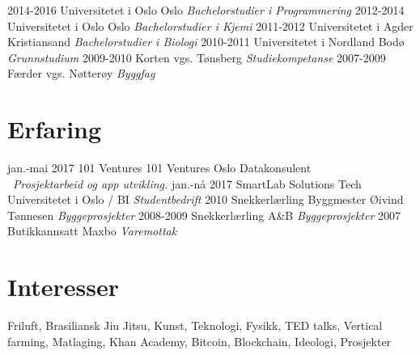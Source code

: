 \documentclass[]{friggeri-cv}
\begin{document}
\begin{entrylist}
  \entry
    {2014-2016}
    {Universitetet i Oslo}
    {Oslo}
    {\emph{Bachelorstudier i Programmering}}
  \entry
    {2012-2014}
    {Universitetet i Oslo}
    {Oslo}
    {\emph{Bachelorstudier i Kjemi}}  
  \entry
    {2011-2012}
    {Universitetet i Agder}
    {Kristiansand}
    {\emph{Bachelorstudier i Biologi}}
  \entry
    {2010-2011}
    {Universitetet i Nordland}
    {Bodø}
    {\emph{Grunnstudium}}
  \entry
    {2009-2010}
    {Korten vgs.}
    {Tønsberg}
    {\emph{Studiekompetanse}}
  \entry
    {2007-2009}
    {Færder vgs.}
    {Nøtterøy}
    {\emph{Byggfag}}
\end{entrylist}

\section{Erfaring}

\begin{entrylist}
  \entry
    {jan.-mai \hfill 2017}
    {101 Ventures}
    {101 Ventures Oslo}
    {Datakonsulent \\\ \emph{Prosjektarbeid og app utvikling.}}
  \entry
    {jan.-nå \hfill 2017}
    {SmartLab Solutions Tech}
    {Universitetet i Oslo / BI}
    {\emph{Studentbedrift}}
  \entry
    {\hfill 2010}
    {Snekkerlærling}
    {Byggmester Øivind Tønnesen}
    {\emph{Byggeprosjekter}}
  \entry
    {\hfill 2008-2009}
    {Snekkerlærling}
    {A\&B}
    {\emph{Byggeprosjekter}}
  \entry
    {\hfill 2007}
    {Butikkannsatt}
    {Maxbo}
    {\emph{Varemottak}}

\end{entrylist}

\section{Interesser}
Friluft, Brasiliansk Jiu Jitsu, Kunst, Teknologi, Fysikk, TED talks, Vertical farming, Matlaging, Khan Academy, Bitcoin, Blockchain, Ideologi, Prosjekter
\end{document}

